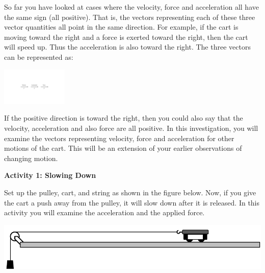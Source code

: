 So far you have looked at cases where the velocity, force and acceleration all
have the same sign (all positive). That is, the vectors representing each of
these three vector quantities all point in the same direction. For example,
if the cart is moving toward the right and a force is exerted toward the right,
then the cart will speed up. Thus the acceleration is also toward the right.
The three vectors can be represented as:

\vspace{0.3cm}
{\par\centering \includegraphics[height=0.7in]{force2/force2_fig1_new.pdf} \par}
\vspace{0.3cm}

If the positive direction is toward the right, then you could also say that
the velocity, acceleration and also force are all positive. In this investigation,
you will examine the vectors representing velocity, force and acceleration for
other motions of the cart. This will be an extension of your earlier observations
of changing motion.

\textbf{Activity 1: Slowing Down} 

Set up the pulley, cart, and string as shown in the figure below. Now, if you give the cart a push away from the pulley, it will slow down after it is released. In this activity you will examine the acceleration and the applied force.

\vspace{0.3cm}
{\par\centering \includegraphics{force2/cart_and_pulley.pdf} \par}
\vspace{0.3cm}

